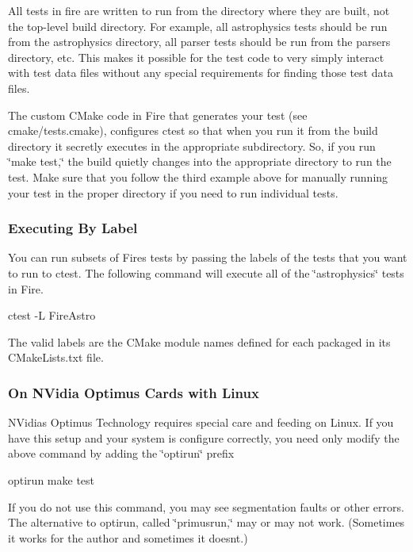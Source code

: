 All tests in fire are written to run from the directory where they are built, not the top-\/level build directory. For example, all astrophysics tests should be run from the astrophysics directory, all parser tests should be run from the parsers directory, etc. This makes it possible for the test code to very simply interact with test data files without any special requirements for finding those test data files.

The custom C\+Make code in Fire that generates your test (see cmake/tests.\+cmake), configures ctest so that when you run it from the build directory it secretly executes in the appropriate subdirectory. So, if you run \char`\"{}make test,\char`\"{} the build quietly changes into the appropriate directory to run the test. Make sure that you follow the third example above for manually running your test in the proper directory if you need to run individual tests.

\subsubsection*{Executing By Label}

You can run subsets of Fire\textquotesingle{}s tests by passing the labels of the tests that you want to run to ctest. The following command will execute all of the \char`\"{}astrophysics\char`\"{} tests in Fire.


\begin{DoxyCode}
ctest -L FireAstro
\end{DoxyCode}


The valid labels are the C\+Make module names defined for each packaged in its C\+Make\+Lists.\+txt file.

\subsubsection*{On N\+Vidia Optimus Cards with Linux}

N\+Vidia\textquotesingle{}s Optimus Technology requires special care and feeding on Linux. If you have this setup and your system is configure correctly, you need only modify the above command by adding the \char`\"{}optirun\char`\"{} prefix


\begin{DoxyCode}
optirun make test
\end{DoxyCode}


If you do not use this command, you may see segmentation faults or other errors. The alternative to optirun, called \char`\"{}primusrun,\char`\"{} may or may not work. (Sometimes it works for the author and sometimes it doesn\textquotesingle{}t.)

